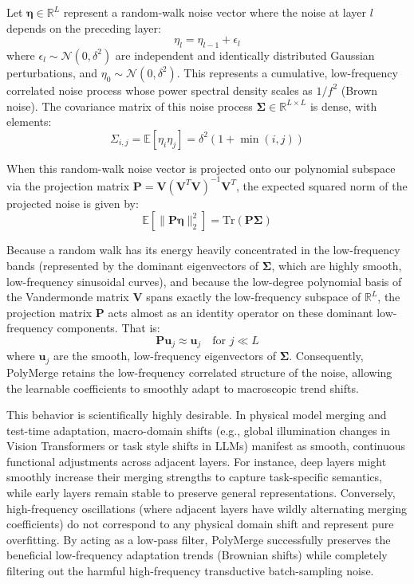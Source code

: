 Let $\boldsymbol{\eta} \in \mathbb{R}^L$ represent a random-walk noise vector where the noise at layer $l$ depends on the preceding layer:
\begin{equation}
\eta_l = \eta_{l-1} + \epsilon_l
\end{equation}
where $\epsilon_l \sim \mathcal{N}(0, \delta^2)$ are independent and identically distributed Gaussian perturbations, and $\eta_0 \sim \mathcal{N}(0, \delta^2)$. This represents a cumulative, low-frequency correlated noise process whose power spectral density scales as $1/f^2$ (Brown noise). The covariance matrix of this noise process $\boldsymbol{\Sigma} \in \mathbb{R}^{L \times L}$ is dense, with elements:
\begin{equation}
\Sigma_{i, j} = \mathbb{E}[\eta_i \eta_j] = \delta^2 (1 + \min(i, j))
\end{equation}

When this random-walk noise vector is projected onto our polynomial subspace via the projection matrix $\mathbf{P} = \mathbf{V}(\mathbf{V}^T\mathbf{V})^{-1}\mathbf{V}^T$, the expected squared norm of the projected noise is given by:
\begin{equation}
\mathbb{E}\left[ \|\mathbf{P}\boldsymbol{\eta}\|_2^2 \right] = \text{Tr}\left(\mathbf{P} \boldsymbol{\Sigma}\right)
\end{equation}

Because a random walk has its energy heavily concentrated in the low-frequency bands (represented by the dominant eigenvectors of $\boldsymbol{\Sigma}$, which are highly smooth, low-frequency sinusoidal curves), and because the low-degree polynomial basis of the Vandermonde matrix $\mathbf{V}$ spans exactly the low-frequency subspace of $\mathbb{R}^L$, the projection matrix $\mathbf{P}$ acts almost as an identity operator on these dominant low-frequency components. That is:
\begin{equation}
\mathbf{P} \mathbf{u}_j \approx \mathbf{u}_j \quad \text{for } j \ll L
\end{equation}
where $\mathbf{u}_j$ are the smooth, low-frequency eigenvectors of $\boldsymbol{\Sigma}$. Consequently, PolyMerge retains the low-frequency correlated structure of the noise, allowing the learnable coefficients to smoothly adapt to macroscopic trend shifts.

This behavior is scientifically highly desirable. In physical model merging and test-time adaptation, macro-domain shifts (e.g., global illumination changes in Vision Transformers or task style shifts in LLMs) manifest as smooth, continuous functional adjustments across adjacent layers. For instance, deep layers might smoothly increase their merging strengths to capture task-specific semantics, while early layers remain stable to preserve general representations. Conversely, high-frequency oscillations (where adjacent layers have wildly alternating merging coefficients) do not correspond to any physical domain shift and represent pure overfitting. By acting as a low-pass filter, PolyMerge successfully preserves the beneficial low-frequency adaptation trends (Brownian shifts) while completely filtering out the harmful high-frequency transductive batch-sampling noise.

